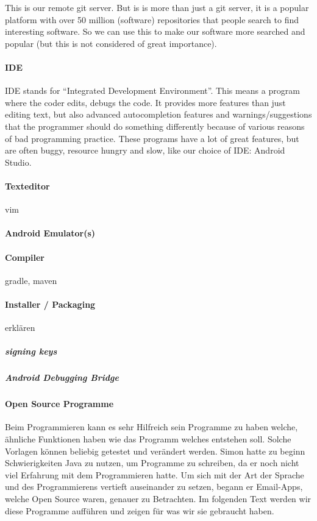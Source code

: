 \documentclass[a4paper,11pt]{article}
\begin{document}
This is our remote git server. But is is more than just a git server, it is a popular platform with over 50 million (software) repositories that people search to find interesting software. So we can use this to make our software more searched and popular (but this is not considered of great importance).

\paragraph{IDE}
IDE stands for ``Integrated Development Environment''. This means a program where the coder edits, debugs the code. It provides more features than just editing text, but also advanced autocompletion features and warnings/suggestions that the programmer should do something differently because of various reasons of bad programming practice. These programs have a lot of great features, but are often buggy, resource hungry and slow, like our choice of IDE: Android Studio.
\paragraph{Texteditor}
vim

\paragraph{Android Emulator(s)}

\paragraph{Compiler}
gradle, maven

\paragraph{Installer / Packaging}
erklären

\subparagraph{signing keys}
\subparagraph{Android Debugging Bridge}


\paragraph{Open Source Programme}

Beim Programmieren kann es sehr Hilfreich sein Programme zu haben welche, ähnliche Funktionen haben wie das Programm welches entstehen soll. 
Solche Vorlagen können beliebig getestet und verändert werden. Simon hatte zu beginn Schwierigkeiten Java zu nutzen, um Programme zu schreiben, da er noch nicht viel 
Erfahrung mit dem Programmieren hatte. Um sich mit der Art der Sprache und des Programmierens vertieft auseinander zu setzen, begann er Email-Apps, welche Open Source
waren, genauer zu Betrachten. Im folgenden Text werden wir diese Programme aufführen und zeigen für was wir sie gebraucht haben. 
\end{document}
